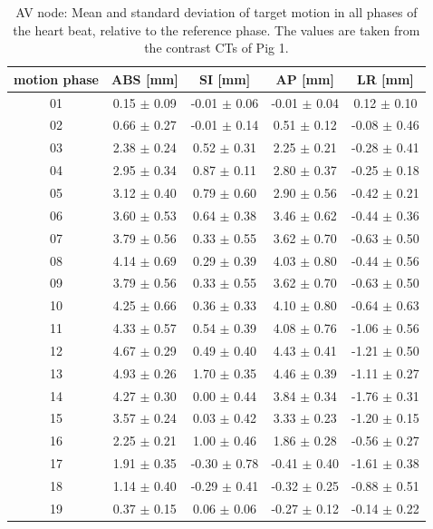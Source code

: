 \documentclass[type=dr, dr=rernat, accentcolor=tud7b,colorbacktitle, bigchapter, openright, twoside, 12pt ]{tudthesis}
\begin{document}
\newpage

\begin{table}[htbp]
  \centering
  \caption{AV node: Mean and standard deviation of target motion in all phases of the heart beat, relative to the reference phase. The values are 
  taken from the contrast CTs of Pig 1.}
  \begin{tabular}{|c|c|c|c|c|}
    \hline\hline
    motion phase\rule{0pt}{2.6ex}\rule[-1.2ex]{0pt}{0pt} & ABS [mm] & SI [mm] & AP [mm] & LR [mm]\\
    \hline
01 &0.15 $\pm$ 0.09 &-0.01 $\pm$ 0.06 &-0.01 $\pm$ 0.04 &0.12 $\pm$ 0.10 \\
02 &0.66 $\pm$ 0.27 &-0.01 $\pm$ 0.14 &0.51 $\pm$ 0.12 &-0.08 $\pm$ 0.46 \\
03 &2.38 $\pm$ 0.24 &0.52 $\pm$ 0.31 &2.25 $\pm$ 0.21 &-0.28 $\pm$ 0.41 \\
04 &2.95 $\pm$ 0.34 &0.87 $\pm$ 0.11 &2.80 $\pm$ 0.37 &-0.25 $\pm$ 0.18 \\
05 &3.12 $\pm$ 0.40 &0.79 $\pm$ 0.60 &2.90 $\pm$ 0.56 &-0.42 $\pm$ 0.21 \\
06 &3.60 $\pm$ 0.53 &0.64 $\pm$ 0.38 &3.46 $\pm$ 0.62 &-0.44 $\pm$ 0.36 \\
07 &3.79 $\pm$ 0.56 &0.33 $\pm$ 0.55 &3.62 $\pm$ 0.70 &-0.63 $\pm$ 0.50 \\
08 &4.14 $\pm$ 0.69 &0.29 $\pm$ 0.39 &4.03 $\pm$ 0.80 &-0.44 $\pm$ 0.56 \\
09 &3.79 $\pm$ 0.56 &0.33 $\pm$ 0.55 &3.62 $\pm$ 0.70 &-0.63 $\pm$ 0.50 \\
10 &4.25 $\pm$ 0.66 &0.36 $\pm$ 0.33 &4.10 $\pm$ 0.80 &-0.64 $\pm$ 0.63 \\
11 &4.33 $\pm$ 0.57 &0.54 $\pm$ 0.39 &4.08 $\pm$ 0.76 &-1.06 $\pm$ 0.56 \\
12 &4.67 $\pm$ 0.29 &0.49 $\pm$ 0.40 &4.43 $\pm$ 0.41 &-1.21 $\pm$ 0.50 \\
13 &4.93 $\pm$ 0.26 &1.70 $\pm$ 0.35 &4.46 $\pm$ 0.39 &-1.11 $\pm$ 0.27 \\
14 &4.27 $\pm$ 0.30 &0.00 $\pm$ 0.44 &3.84 $\pm$ 0.34 &-1.76 $\pm$ 0.31 \\
15 &3.57 $\pm$ 0.24 &0.03 $\pm$ 0.42 &3.33 $\pm$ 0.23 &-1.20 $\pm$ 0.15 \\
16 &2.25 $\pm$ 0.21 &1.00 $\pm$ 0.46 &1.86 $\pm$ 0.28 &-0.56 $\pm$ 0.27 \\
17 &1.91 $\pm$ 0.35 &-0.30 $\pm$ 0.78 &-0.41 $\pm$ 0.40 &-1.61 $\pm$ 0.38 \\
18 &1.14 $\pm$ 0.40 &-0.29 $\pm$ 0.41 &-0.32 $\pm$ 0.25 &-0.88 $\pm$ 0.51 \\
19 &0.37 $\pm$ 0.15 &0.06 $\pm$ 0.06 &-0.27 $\pm$ 0.12 &-0.14 $\pm$ 0.22 \\
    \hline\hline
  \end{tabular}
  \label{tab:motion:AV:Pig1}
\end{table}
\end{document}
